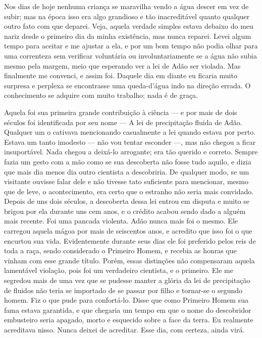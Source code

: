 Nos dias de hoje nenhuma criança se maravilha vendo a água descer em vez de subir; mas
na época isso era algo grandioso e tão inacreditável quanto qualquer outro fato
com que deparei. Veja, aquela verdade simples estava debaixo do meu nariz desde o
primeiro dia da minha existência, mas nunca reparei. Levei algum tempo
para aceitar e me ajustar a ela, e por um bom tempo não podia olhar para uma
correnteza sem verificar voluntária ou involuntariamente se a água não subia mesmo
pela margem, meio que esperando ver a lei de Adão ser violada. Mas finalmente
me convenci, e assim foi. Daquele dia em diante eu ficaria muito surpresa e
perplexa se encontrasse uma queda-d’água indo na direção errada. O conhecimento se
adquire com muito trabalho; nada é de graça.

Aquela foi sua primeira grande contribuição à ciência --- e por mais de dois séculos
foi identificada por seu nome --- A lei de precipitação fluida de Adão. Qualquer um
o cativava mencionando casualmente a lei quando estava por perto. Estava um tanto
imodesto --- não vou tentar esconder ---, mas não chegou a ficar insuportável.
Nada chegou a deixá-lo arrogante; era tão querido e correto. Sempre fazia um gesto
com a mão como se sua descoberta não fosse tudo aquilo, e dizia que mais dia menos
dia outro cientista a descobriria. De qualquer modo, se um visitante ouvisse falar
dele e não tivesse tato suficiente para mencionar, mesmo que de leve, o acontecimento, era
certo que o estranho não seria mais convidado. Depois de uns dois séculos, a
descoberta dessa lei entrou em disputa e muito se brigou por ela durante uns cem anos,
e o crédito acabou sendo dado a alguém mais recente. Foi uma pancada
violenta. Adão nunca mais foi o mesmo. Ele carregou aquela mágoa
por mais de seiscentos anos, e acredito que isso foi o que encurtou sua vida.
Evidentemente durante seus dias ele foi preferido pelos reis de toda a raça,
sendo considerado o Primeiro Homem, e recebia as honras que vinham com esse grande
título. Porém, essas distinções não compensaram aquela lamentável violação, pois
foi um verdadeiro cientista, e o primeiro. Ele me segredou mais de uma vez que se
pudesse manter a glória da lei de precipitação de fluidos não teria se
importado de se passar por filho e tornar-se o segundo homem. Fiz o que pude para
confortá-lo. Disse que como Primeiro Homem sua fama estava garantida, e que
chegaria um tempo em que o nome do descobridor embusteiro seria apagado, morto e
esquecido sobre a face da terra. Eu realmente acreditava nisso. Nunca deixei de
acreditar. Esse dia, com certeza, ainda virá.

